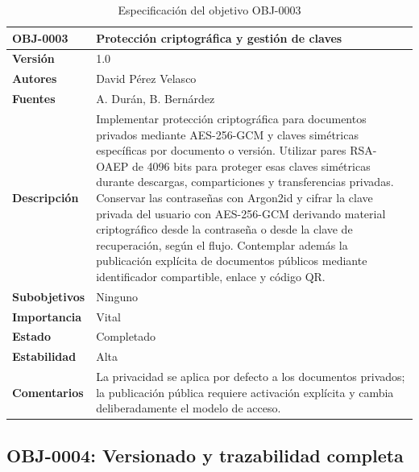\documentclass[11pt, a4paper]{article}
\begin{document}
\begin{table}[H]
    \centering
    \small
    \begin{tabular}{|p{4cm}|p{10cm}|}
    \hline
    \textbf{OBJ-0003} & Protección criptográfica y gestión de claves \\
    \hline
    \textbf{Versión} & 1.0 \\
    \hline
    \textbf{Autores} & David Pérez Velasco \\
    \hline
    \textbf{Fuentes} & A. Durán, B. Bernárdez \\
    \hline
    \textbf{Descripción} & Implementar protección criptográfica para documentos privados mediante AES-256-GCM y claves simétricas específicas por documento o versión. Utilizar pares RSA-OAEP de 4096 bits para proteger esas claves simétricas durante descargas, comparticiones y transferencias privadas. Conservar las contraseñas con Argon2id y cifrar la clave privada del usuario con AES-256-GCM derivando material criptográfico desde la contraseña o desde la clave de recuperación, según el flujo. Contemplar además la publicación explícita de documentos públicos mediante identificador compartible, enlace y código QR. \\
    \hline
    \textbf{Subobjetivos} & Ninguno \\
    \hline
    \textbf{Importancia} & Vital \\
    \hline
    \textbf{Estado} & Completado \\
    \hline
    \textbf{Estabilidad} & Alta \\
    \hline
    \textbf{Comentarios} & La privacidad se aplica por defecto a los documentos privados; la publicación pública requiere activación explícita y cambia deliberadamente el modelo de acceso. \\
    \hline
    \end{tabular}
    \caption{Especificación del objetivo OBJ-0003}
\end{table}

\subsection{OBJ-0004: Versionado y trazabilidad completa}
\end{document}
